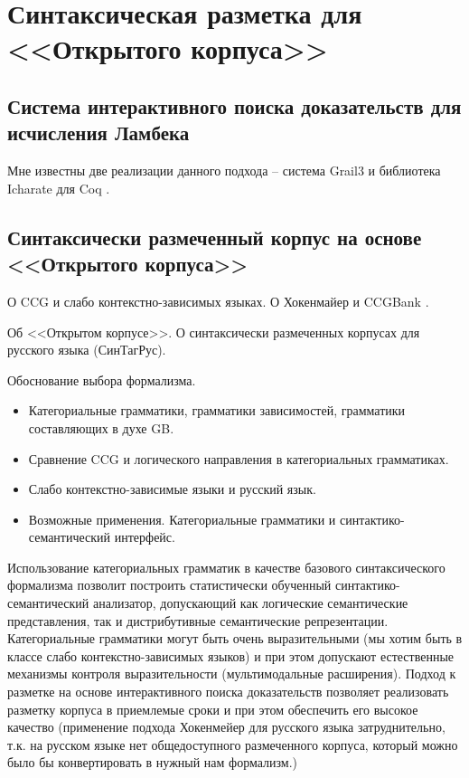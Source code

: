 \chapter{Синтаксическая разметка для <<Открытого корпуса>>}

\section{Система интерактивного поиска доказательств для исчисления Ламбека}

Мне известны две реализации данного подхода -- система Grail3 \parencite{moot2002proof} и библиотека Icharate для Coq \parencite{anoun2007approche}.

\section{Синтаксически размеченный корпус на основе <<Открытого корпуса>>}

О CCG и слабо контекстно-зависимых языках. О Хокенмайер и CCGBank \parencite{capelletti2009parsing}.


Об <<Открытом корпусе>>. О синтаксически размеченных корпусах для русского языка (СинТагРус).


Обоснование выбора формализма.

\begin{itemize}
    \item Категориальные грамматики, грамматики зависимостей, грамматики составляющих в духе GB. 
    \item Сравнение CCG и логического направления в категориальных грамматиках. 
    \item Слабо контекстно-зависимые языки и русский язык.
    \item Возможные применения. Категориальные грамматики и синтактико-семантический интерфейс. 
\end{itemize}


Использование категориальных грамматик в качестве базового синтаксического формализма позволит построить статистически обученный синтактико-семантический анализатор, допускающий как логические семантические представления, так и дистрибутивные семантические репрезентации. Категориальные грамматики могут быть очень выразительными (мы хотим быть в классе слабо контекстно-зависимых языков) и при этом допускают естественные механизмы контроля выразительности (мультимодальные расширения). Подход к разметке на основе интерактивного поиска доказательств позволяет реализовать разметку корпуса в приемлемые сроки и при этом обеспечить его высокое качество (применение подхода Хокенмейер для русского языка затруднительно, т.к. на русском языке нет общедоступного размеченного корпуса, который можно было бы конвертировать в нужный нам формализм.)